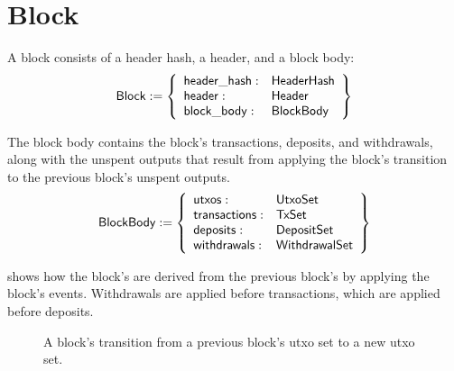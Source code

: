 \documentclass[../midgard.tex]{subfiles}
\begin{document}
\section{Block}
\label{h:block}

A block consists of a header hash, a header, and a block body:
\begin{equation*}
    \mathsf{Block} := \left\{
    \begin{array}{ll}
        \mathsf{header\_hash} : & \mathsf{HeaderHash} \\
        \mathsf{header} : & \mathsf{Header} \\
        \mathsf{block\_body} : & \mathsf{BlockBody}
    \end{array} \right\}
\end{equation*}

The block body contains the block's transactions, deposits, and withdrawals, along with
the unspent outputs that result from applying the block's transition to the previous block's unspent outputs.
\begin{equation*}
    \mathsf{BlockBody} := \left\{
    \begin{array}{ll}
        \mathsf{utxos} : & \mathsf{UtxoSet} \\
        \mathsf{transactions} : & \mathsf{TxSet} \\
        \mathsf{deposits} : & \mathsf{DepositSet} \\
        \mathsf{withdrawals} : & \mathsf{WithdrawalSet} \\
    \end{array} \right\}
\end{equation*}

 shows how the block's  are derived from the previous block's  by applying the block's events.
Withdrawals are applied before transactions, which are applied before deposits.

\begin{figure}[htb] %
    \centering %
    \caption{A block's transition from a previous block's utxo set to a new utxo set.}
    \label{fig:block-transition}
\end{figure}
\end{document}
